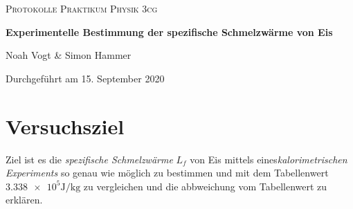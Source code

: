 \documentclass[a4paper,12pt]{article}
\begin{document}
\begin{titlepage}

\vspace*{1cm}
	\centering
	
	{\scshape\Large Protokolle Praktikum Physik 3cg \par}
	\vspace{0.5cm}
	{\huge\bfseries Experimentelle Bestimmung der spezifische Schmelzwärme von Eis\par}
	\vspace{0.5cm}
	{\Large Noah Vogt \& Simon Hammer\par}
	\vspace{0.5cm}

	{\large Durchgeführt am 15. September 2020\par}
	
\end{titlepage}

\tableofcontents
\pagebreak

\section{Versuchsziel}
Ziel ist es die \textit{spezifische Schmelzwärme} $L_f$ von Eis mittels eines\textit{kalorimetrischen Experiments} so genau wie möglich zu bestimmen und mit dem Tabellenwert $ \num{3.338 e5}\si{\J\per\kg} $ zu vergleichen und die abbweichung vom Tabellenwert zu erklären.
\end{document}
